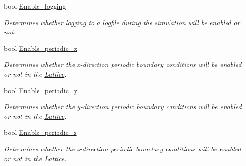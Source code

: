 \begin{DoxyCompactItemize}
\item 
\mbox{\label{struct_parameters___simulation_afde5aaac6f3cd226249cb9646a4c8a4b}} 
bool \hyperlink{struct_parameters___simulation_afde5aaac6f3cd226249cb9646a4c8a4b}{Enable\+\_\+logging}
\begin{DoxyCompactList}\small\item\em Determines whether logging to a logfile during the simulation will be enabled or not. \end{DoxyCompactList}\item 
\mbox{\label{struct_parameters___simulation_a5624782454dd99271ad94923f53866b4}} 
bool \hyperlink{struct_parameters___simulation_a5624782454dd99271ad94923f53866b4}{Enable\+\_\+periodic\+\_\+x}
\begin{DoxyCompactList}\small\item\em Determines whether the x-\/direction periodic boundary conditions will be enabled or not in the \hyperlink{class_lattice}{Lattice}. \end{DoxyCompactList}\item 
\mbox{\label{struct_parameters___simulation_a1c3d79a4dcf194f884e8a3d346c2261a}} 
bool \hyperlink{struct_parameters___simulation_a1c3d79a4dcf194f884e8a3d346c2261a}{Enable\+\_\+periodic\+\_\+y}
\begin{DoxyCompactList}\small\item\em Determines whether the y-\/direction periodic boundary conditions will be enabled or not in the \hyperlink{class_lattice}{Lattice}. \end{DoxyCompactList}\item 
\mbox{\label{struct_parameters___simulation_a0d318f1a9eb75fa909b4ae8266696be1}} 
bool \hyperlink{struct_parameters___simulation_a0d318f1a9eb75fa909b4ae8266696be1}{Enable\+\_\+periodic\+\_\+z}
\begin{DoxyCompactList}\small\item\em Determines whether the z-\/direction periodic boundary conditions will be enabled or not in the \hyperlink{class_lattice}{Lattice}. \end{DoxyCompactList}\item 
\mbox{\label{struct_parameters___simulation_a038f418e1b2e4fec3fc6a8336f8b23de}} 

\end{DoxyCompactItemize}

